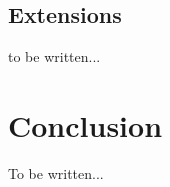\documentclass[12pt,oneside]{article}
\begin{document}
\subsection{Extensions}
to be written...

\section{Conclusion}
\label{sec:conclusion}

To be written...

\printbibliography%
\end{document}
